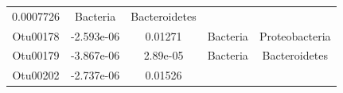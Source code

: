 \documentclass[]{article}
\begin{document}
\begin{longtable}[]{@{}ccccc@{}}
\begin{minipage}[t]{0.14\columnwidth}
0.0007726\strut
\end{minipage} & \begin{minipage}[t]{0.13\columnwidth}\centering\strut
Bacteria\strut
\end{minipage} & \begin{minipage}[t]{0.27\columnwidth}\centering\strut
Bacteroidetes\strut
\end{minipage}\tabularnewline
\begin{minipage}[t]{0.13\columnwidth}\centering\strut
Otu00178\strut
\end{minipage} & \begin{minipage}[t]{0.16\columnwidth}\centering\strut
-2.593e-06\strut
\end{minipage} & \begin{minipage}[t]{0.14\columnwidth}\centering\strut
0.01271\strut
\end{minipage} & \begin{minipage}[t]{0.13\columnwidth}\centering\strut
Bacteria\strut
\end{minipage} & \begin{minipage}[t]{0.27\columnwidth}\centering\strut
Proteobacteria\strut
\end{minipage}\tabularnewline
\begin{minipage}[t]{0.13\columnwidth}\centering\strut
Otu00179\strut
\end{minipage} & \begin{minipage}[t]{0.16\columnwidth}\centering\strut
-3.867e-06\strut
\end{minipage} & \begin{minipage}[t]{0.14\columnwidth}\centering\strut
2.89e-05\strut
\end{minipage} & \begin{minipage}[t]{0.13\columnwidth}\centering\strut
Bacteria\strut
\end{minipage} & \begin{minipage}[t]{0.27\columnwidth}\centering\strut
Bacteroidetes\strut
\end{minipage}\tabularnewline
\begin{minipage}[t]{0.13\columnwidth}\centering\strut
Otu00202\strut
\end{minipage} & \begin{minipage}[t]{0.16\columnwidth}\centering\strut
-2.737e-06\strut
\end{minipage} & \begin{minipage}[t]{0.14\columnwidth}\centering\strut
0.01526\strut
\end{minipage} & \begin{minipage}[t]{0.13\columnwidth}\centering\strut

\end{minipage}
\end{longtable}
\end{document}
